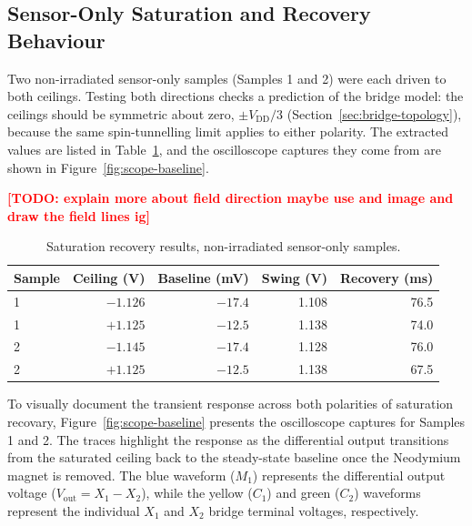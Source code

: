 \documentclass[12pt,a4paper]{article}
\newcommand{\todo}[1]{\textcolor{red}{\textbf{[TODO: #1]}}}
\begin{document}
\subsection{Sensor-Only Saturation and Recovery Behaviour}
\label{sec:standalone-sat-recovery}

Two non-irradiated sensor-only samples (Samples 1 and 2) were each driven to both ceilings. Testing both directions checks a prediction of the bridge model: the ceilings should be symmetric about zero, $\pm V_{\text{DD}}/3$ (Section~\ref{sec:bridge-topology}), because the same spin-tunnelling limit applies to either polarity. The extracted values are listed in Table~\ref{tab:sat-nonirr-sensoronly}, and the oscilloscope captures they come from are shown in Figure~\ref{fig:scope-baseline}.

\todo{explain more about field direction maybe use and image and draw the field lines ig}


\begin{table}[H]
\centering
\caption{Saturation recovery results, non-irradiated sensor-only samples.}
\label{tab:sat-nonirr-sensoronly}
\begin{tabular}{@{}lrrrr@{}}
\toprule
Sample & Ceiling (V) & Baseline (mV) & Swing (V) & Recovery (ms) \\
\midrule
1 & $-1.126$ & $-17.4$ & 1.108 & 76.5 \\
1 & $+1.125$ & $-12.5$ & 1.138 & 74.0 \\
2 & $-1.145$ & $-17.4$ & 1.128 & 76.0 \\
2 & $+1.125$ & $-12.5$ & 1.138 & 67.5 \\
\bottomrule
\end{tabular}
\end{table}


To visually document the transient response across both polarities of saturation recovary, Figure~\ref{fig:scope-baseline} presents the oscilloscope captures for Samples 1 and 2. The traces highlight the response as the differential output transitions from the saturated ceiling back to the steady-state baseline once the Neodymium magnet is removed.  The blue waveform ($M_1$) represents the differential output voltage ($V_{\text{out}} = X_1 - X_2$), while the yellow ($C_1$) and green ($C_2$) waveforms represent the individual $X_1$ and $X_2$ bridge terminal voltages, respectively.
\end{document}
